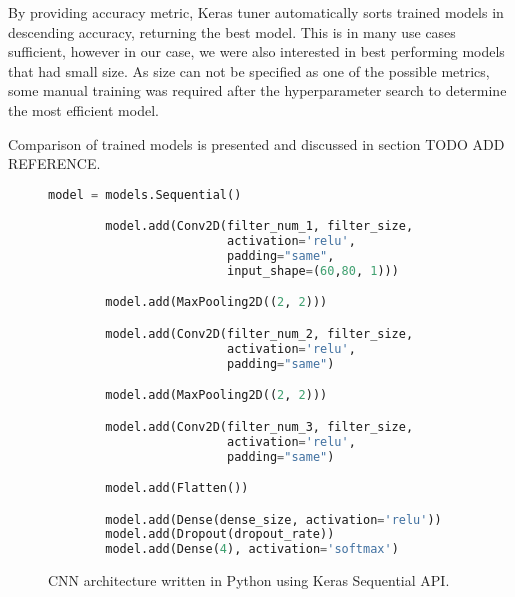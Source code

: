 By providing accuracy metric, Keras tuner automatically sorts trained models in descending accuracy, returning the best model.
This is in many use cases sufficient, however in our case, we were also interested in best performing models that had small size. 
As size can not be specified as one of the possible metrics, some manual training was required after the hyperparameter search to determine the most efficient model.

Comparison of trained models is presented and discussed in section TODO ADD REFERENCE.



\lstset{style=mystyle}

\begin{figure}[ht] 
    \begin{lstlisting}[language=Python]
        model = models.Sequential()

        model.add(Conv2D(filter_num_1, filter_size, 
                         activation='relu', 
                         padding="same", 
                         input_shape=(60,80, 1)))

        model.add(MaxPooling2D((2, 2)))

        model.add(Conv2D(filter_num_2, filter_size, 
                         activation='relu', 
                         padding="same")

        model.add(MaxPooling2D((2, 2)))

        model.add(Conv2D(filter_num_3, filter_size, 
                         activation='relu', 
                         padding="same")

        model.add(Flatten())

        model.add(Dense(dense_size, activation='relu'))
        model.add(Dropout(dropout_rate))
        model.add(Dense(4), activation='softmax')
    \end{lstlisting}
    \caption{ CNN architecture written in Python using Keras Sequential API.}
    \label{model_code}
\end{figure}


